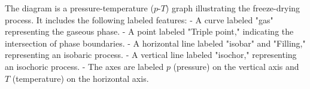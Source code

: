 The diagram is a pressure-temperature (\(p\)-\(T\)) graph illustrating the freeze-drying process. It includes the following labeled features:  
- A curve labeled "gas" representing the gaseous phase.  
- A point labeled "Triple point," indicating the intersection of phase boundaries.  
- A horizontal line labeled "isobar" and "Filling," representing an isobaric process.  
- A vertical line labeled "isochor," representing an isochoric process.  
- The axes are labeled \(p\) (pressure) on the vertical axis and \(T\) (temperature) on the horizontal axis.